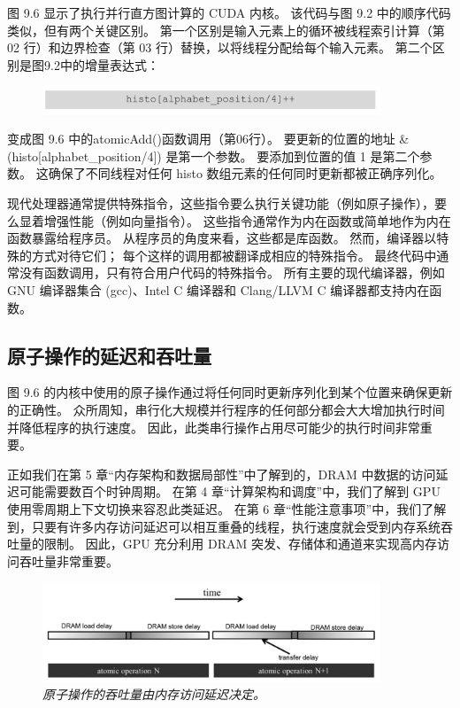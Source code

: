 图 9.6 显示了执行并行直方图计算的 CUDA 内核。 该代码与图 9.2 中的顺序代码类似，但有两个关键区别。 
第一个区别是输入元素上的循环被线程索引计算（第 02 行）和边界检查（第 03 行）替换，以将线程分配给每个输入元素。 
第二个区别是图9.2中的增量表达式：

\begin{figure}[H]
	\centering
	\includegraphics[width=0.9\textwidth]{figs/F9-a2.png}
\end{figure}

变成图 9.6 中的atomicAdd()函数调用（第06行）。 要更新的位置的地址 \&(histo[alphabet\_position/4]) 是第一个参数。
要添加到位置的值 1 是第二个参数。 这确保了不同线程对任何 histo 数组元素的任何同时更新都被正确序列化。

\begin{remark}[内部函数]
现代处理器通常提供特殊指令，这些指令要么执行关键功能（例如原子操作），要么显着增强性能（例如向量指令）。 
这些指令通常作为内在函数或简单地作为内在函数暴露给程序员。 从程序员的角度来看，这些都是库函数。 
然而，编译器以特殊的方式对待它们； 每个这样的调用都被翻译成相应的特殊指令。 
最终代码中通常没有函数调用，只有符合用户代码的特殊指令。 
所有主要的现代编译器，例如 GNU 编译器集合 (gcc)、Intel C 编译器和 Clang/LLVM C 编译器都支持内在函数。
\end{remark}

\subsection{原子操作的延迟和吞吐量}
图 9.6 的内核中使用的原子操作通过将任何同时更新序列化到某个位置来确保更新的正确性。 
众所周知，串行化大规模并行程序的任何部分都会大大增加执行时间并降低程序的执行速度。 
因此，此类串行操作占用尽可能少的执行时间非常重要。

正如我们在第 5 章“内存架构和数据局部性”中了解到的，DRAM 中数据的访问延迟可能需要数百个时钟周期。 
在第 4 章“计算架构和调度”中，我们了解到 GPU 使用零周期上下文切换来容忍此类延迟。 
在第 6 章“性能注意事项”中，我们了解到，只要有许多内存访问延迟可以相互重叠的线程，执行速度就会受到内存系统吞吐量的限制。 
因此，GPU 充分利用 DRAM 突发、存储体和通道来实现高内存访问吞吐量非常重要。

\begin{figure}[H]
	\centering
	\includegraphics[width=0.9\textwidth]{figs/F9.7.png}
	\caption{\textit{原子操作的吞吐量由内存访问延迟决定。}}
\end{figure}

